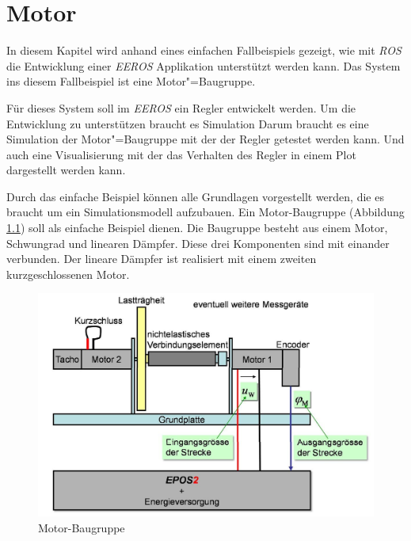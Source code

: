 \chapter{Motor}


In diesem Kapitel wird anhand eines einfachen Fallbeispiels gezeigt, wie mit \textit{ROS} die Entwicklung einer \textit{EEROS} Applikation unterstützt werden kann. 
Das System ins diesem Fallbeispiel ist eine Motor"=Baugruppe.

Für dieses System soll im \textit{EEROS} ein Regler entwickelt werden.
Um die Entwicklung zu unterstützen braucht es Simulation 
Darum braucht es eine Simulation der Motor"=Baugruppe mit der der Regler getestet werden kann.
Und auch eine Visualisierung mit der das Verhalten des Regler in einem Plot dargestellt werden kann.

Durch das einfache Beispiel können alle Grundlagen vorgestellt werden, die es braucht um ein Simulationsmodell aufzubauen.
Ein Motor-Baugruppe (Abbildung \ref{Ab:motor-baugruppe}) soll als einfache Beispiel dienen.
Die Baugruppe besteht aus einem Motor, Schwungrad und linearen Dämpfer.
Diese drei Komponenten sind mit einander verbunden.
Der lineare Dämpfer ist realisiert mit einem zweiten kurzgeschlossenen Motor.

\begin{figure}[ht!]
\centering
\includegraphics[width=14.5cm]{images/motor_baugruppe.png} %
\caption{Motor-Baugruppe}
\label{Ab:motor-baugruppe}
\end{figure}

